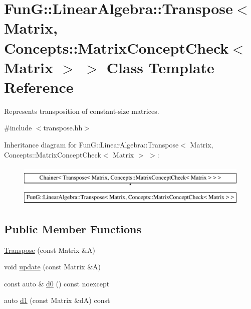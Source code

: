 \hypertarget{classFunG_1_1LinearAlgebra_1_1Transpose_3_01Matrix_00_01Concepts_1_1MatrixConceptCheck_3_01Matrix_01_4_01_4}{}\section{FunG\+:\+:Linear\+Algebra\+:\+:Transpose$<$ Matrix, Concepts\+:\+:Matrix\+Concept\+Check$<$ Matrix $>$ $>$ Class Template Reference}
\label{classFunG_1_1LinearAlgebra_1_1Transpose_3_01Matrix_00_01Concepts_1_1MatrixConceptCheck_3_01Matrix_01_4_01_4}


Represents transposition of constant-\/size matrices.  




{\ttfamily \#include $<$transpose.\+hh$>$}

Inheritance diagram for FunG\+:\+:Linear\+Algebra\+:\+:Transpose$<$ Matrix, Concepts\+:\+:Matrix\+Concept\+Check$<$ Matrix $>$ $>$\+:\begin{figure}[H]
\begin{center}
\leavevmode
\includegraphics[height=2.000000cm]{classFunG_1_1LinearAlgebra_1_1Transpose_3_01Matrix_00_01Concepts_1_1MatrixConceptCheck_3_01Matrix_01_4_01_4}
\end{center}
\end{figure}
\subsection*{Public Member Functions}
\begin{DoxyCompactItemize}
\item 
\hyperlink{classFunG_1_1LinearAlgebra_1_1Transpose_3_01Matrix_00_01Concepts_1_1MatrixConceptCheck_3_01Matrix_01_4_01_4_adbcb05dc37fc93a30c3d131069b5cb98}{Transpose} (const Matrix \&A)
\item 
void \hyperlink{classFunG_1_1LinearAlgebra_1_1Transpose_3_01Matrix_00_01Concepts_1_1MatrixConceptCheck_3_01Matrix_01_4_01_4_abb53a9d48f7a4be92e6788a6d668bcfe}{update} (const Matrix \&A)
\item 
const auto \& \hyperlink{classFunG_1_1LinearAlgebra_1_1Transpose_3_01Matrix_00_01Concepts_1_1MatrixConceptCheck_3_01Matrix_01_4_01_4_afd43d1b0dbdb880c476fb66cbf239fb9}{d0} () const noexcept
\item 
auto \hyperlink{classFunG_1_1LinearAlgebra_1_1Transpose_3_01Matrix_00_01Concepts_1_1MatrixConceptCheck_3_01Matrix_01_4_01_4_a23a99c7b218fb61ae39c0e796dde050b}{d1} (const Matrix \&dA) const 
\end{DoxyCompactItemize}


